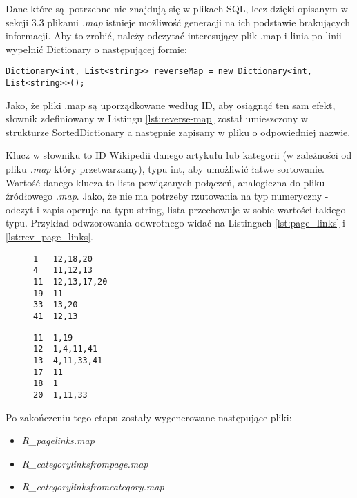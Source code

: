 Dane które są potrzebne nie znajdują się w plikach SQL, lecz dzięki opisanym w sekcji 3.3 plikami \textit{.map} istnieje możliwość generacji na ich podstawie brakujących informacji. Aby to zrobić, należy odczytać interesujący plik .map i linia po linii wypełnić Dictionary o następującej formie:

\begin{lstlisting}[caption={Słownik przechowujący odwzorowanie odwrotne}, label=lst:reverse-map]
Dictionary<int, List<string>> reverseMap = new Dictionary<int, List<string>>();
\end{lstlisting}

Jako, że pliki .map są uporządkowane według ID, aby osiągnąć ten sam efekt, słownik zdefiniowany w Listingu \ref{lst:reverse-map} został umieszczony w strukturze SortedDictionary a następnie zapisany w pliku o odpowiedniej nazwie. 

Klucz w słowniku to ID Wikipedii danego artykułu lub kategorii (w zależności od pliku \textit{.map} który przetwarzamy), typu int, aby umożliwić łatwe sortowanie. Wartość danego klucza to lista powiązanych połączeń, analogiczna do pliku źródłowego \textit{.map}. Jako, że nie ma potrzeby rzutowania na typ numeryczny - odczyt i zapis operuje na typu string, lista przechowuje w sobie wartości takiego typu. Przykład odwzorowania odwrotnego widać na Listingach \ref{lst:page_links} i \ref{lst:rev_page_links}.

\begin{center}
\begin{figure}[!h]
    \begin{minipage}[c]{0.45\linewidth}
        \begin{lstlisting}[frame=single,caption={Przykładowy fragment pliku pagelinks.map},label=lst:page_links]
1   12,18,20
4   11,12,13
11  12,13,17,20
19  11
33  13,20
41  12,13
\end{lstlisting}
    \end{minipage}
    \begin{minipage}[c]{0.45\linewidth}
        \begin{lstlisting}[frame=single,caption={Odwzorowanie odwrotne z Listingu \ref{lst:page_links} (fragment R\_pagelinks.map)},label=lst:rev_page_links]
11  1,19
12  1,4,11,41
13  4,11,33,41
17  11
18  1
20  1,11,33
\end{lstlisting}
    \end{minipage}
\end{figure}
\end{center}Po zakończeniu tego etapu zostały wygenerowane następujące pliki:
\begin{itemize}
    \item \textit{R\_pagelinks.map}
    \item \textit{R\_categorylinksfrompage.map}
    \item \textit{R\_categorylinksfromcategory.map}
\end{itemize}

